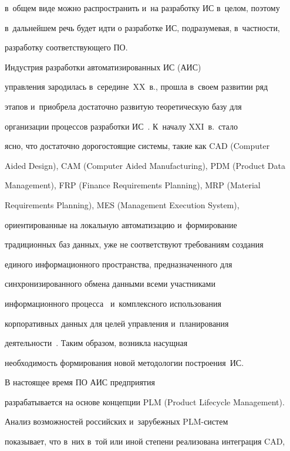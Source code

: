 в~общем виде можно распространить и~на разработку ИС в~целом, поэтому 


в~дальнейшем речь будет идти о разработке ИС, подразумевая, в~частности, 


разработку соответствующего ПО. 


     


     Индустрия разработки автоматизированных ИС (АИС)


управ\-ле\-ния зародилась в~середине~XX~в., прошла в~своем развитии ряд 


этапов и~приобрела достаточно развитую теоретическую базу для 


организации процессов разработки ИС~\cite{24-luk}. К~началу XXI~в.\ стало 


ясно, что достаточно до\-ро\-го\-сто\-ящие сис\-те\-мы, такие как CAD (Computer 


Aided Design), CAM (Computer Aided Manufacturing), PDM (Product Data 


Management), FRP (Finance Requirements Planning), MRP (Material 


Requirements Planning), MES (Management Execution System), 


ориентированные на локальную автоматизацию и~формирование 


традиционных баз данных, уже не соответствуют требованиям создания 


единого информационного пространства, предназначенного для 


синхронизированного обмена данными всеми участниками 


информационного процесса~\cite{25-luk} и~комплексного использования 


корпоративных данных для целей управления и~планирования 


деятельности~\cite{24-luk}. Таким образом, возникла насущная 


необходимость формирования новой методологии построения~ИС.


     


     В настоящее время ПО АИС предприятия 


разрабатывается на основе концепции PLM (Product Lifecycle Management). 


Анализ возможностей российских и~зарубежных PLM-сис\-тем~\cite{25-luk} 


показывает, что в~них в~той или иной степени реализована интеграция CAD, 


